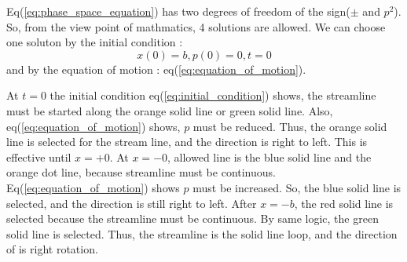 \documentclass{jarticle}
\begin{document}
Eq(\ref{eq:phase_space_equation}) has two degrees of freedom of the sign($\pm$ and $p^2$). So, from the view point of mathmatics, 4 solutions are allowed. 
We can choose one soluton by the initial condition : 
\begin{equation}\label{eq:initial_condition}
	x(0) = b, p(0) = 0, t=0
\end{equation}
and by the equation of motion : eq(\ref{eq:equation_of_motion}).

At $t=0$ the initial condition eq(\ref{eq:initial_condition}) shows, the streamline must be started along the orange solid line or green solid line. Also, eq(\ref{eq:equation_of_motion}) shows, $p$ must be reduced. Thus, the orange solid line is selected for the stream line, and the direction is right to left. This is effective until $x=+0$. 
At $x=-0$, allowed line is the blue solid line and the orange dot line, because streamline must be continuous. Eq(\ref{eq:equation_of_motion}) shows $p$ must be increased. So, the blue solid line is selected, and the direction is still right to left. After $x = -b$, the red solid line is selected because the streamline must be continuous. 
By same logic, the green solid line is selected. 
Thus, the streamline is the solid line loop, and the direction of is right rotation.
\end{document}
